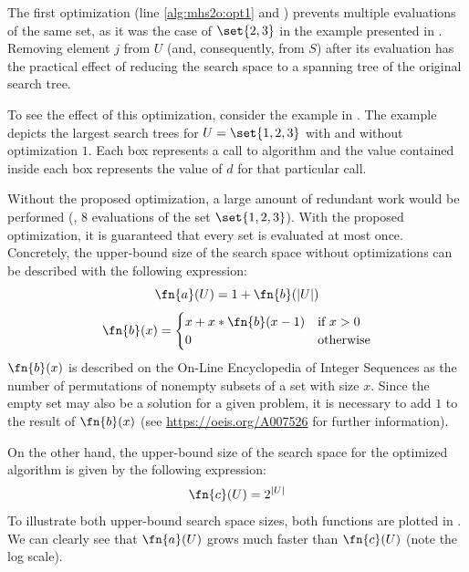 The first optimization (line \ref{alg:mhs2o:opt1} and
) prevents multiple evaluations of the
same set, as it was the case of $\set{2,3}$ in the example presented
in .
%
Removing element $j$ from $U$ (and, consequently, from $S$) after its
evaluation has the practical effect of reducing the search space to a
spanning tree of the original search tree.

To see the effect of this optimization, consider the example in
.
%
The example depicts the largest search trees for $U=\set{1,2,3}$ with
and without optimization $1$.
%
Each box represents a call to algorithm and the value contained inside
each box represents the value of $d$ for that particular call.

Without the proposed optimization, a large amount of redundant work
would be performed (\eg, $8$ evaluations of the set $\set{1,2,3}$).
%
With the proposed optimization, it is guaranteed that every set is
evaluated at most once.
%
Concretely, the upper-bound size of the search space without
optimizations can be described with the following
expression:
\begin{equation}
  \fn{a}(U) = 1 + \fn{b}(|U|)
  \label{eq:mhs2o:no-opt-upper-bound}
\end{equation}
\begin{equation}
  \fn{b}(x) = \begin{cases}
    x + x * \fn{b}(x-1) & \textrm{if~} x > 0 \\
    0              & \textrm{otherwise}
  \end{cases}
\end{equation}
\noindent
$\fn{b}(x)$ is described on the On-Line Encyclopedia of Integer
Sequences as the number of permutations of nonempty subsets of a set
with size $x$. Since the empty set may also be a solution for a given
problem, it is necessary to add $1$ to the result of $\fn{b}(x)$ (see
\url{https://oeis.org/A007526} for further information).

On the other hand, the upper-bound size of the search space for the
optimized algorithm is given by the following expression:
\begin{equation}
  \label{eq:mhs2o:opt-upper-bound}
  \displaystyle \fn{c}(U) = 2^{|U|}
\end{equation}
\noindent
To illustrate both upper-bound search space sizes, both functions are
plotted in .
%
We can clearly see that $\fn{a}(U)$ grows much faster than $\fn{c}(U)$
(note the log scale).

